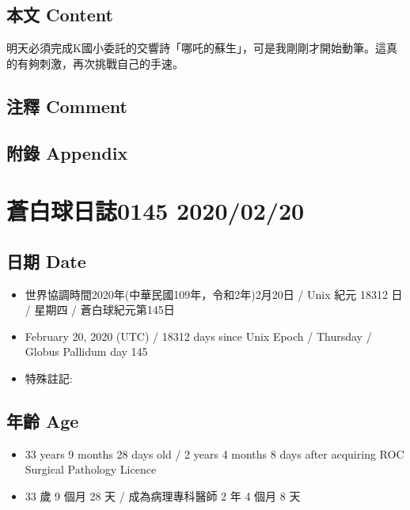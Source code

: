 \documentclass[
]{article}
\providecommand{\tightlist}{%
  \setlength{\itemsep}{0pt}\setlength{\parskip}{0pt}}
\begin{document}
\hypertarget{ux672cux6587-content-18}{%
\subsection{本文 Content}\label{ux672cux6587-content-18}}

明天必須完成K國小委託的交響詩「哪吒的蘇生」，可是我剛剛才開始動筆。這真的有夠刺激，再次挑戰自己的手速。

\hypertarget{ux6ce8ux91cb-comment-18}{%
\subsection{注釋 Comment}\label{ux6ce8ux91cb-comment-18}}

\hypertarget{ux9644ux9304-appendix-18}{%
\subsection{附錄 Appendix}\label{ux9644ux9304-appendix-18}}

\hypertarget{ux84bcux767dux7403ux65e5ux8a8c0145-20200220}{%
\section{蒼白球日誌0145
2020/02/20}\label{ux84bcux767dux7403ux65e5ux8a8c0145-20200220}}

\hypertarget{ux65e5ux671f-date-19}{%
\subsection{日期 Date}\label{ux65e5ux671f-date-19}}

\begin{itemize}
\tightlist
\item
  世界協調時間2020年(中華民國109年，令和2年)2月20日 / Unix 紀元 18312 日
  / 星期四 / 蒼白球紀元第145日
\item
  February 20, 2020 (UTC) / 18312 days since Unix Epoch / Thursday /
  Globus Pallidum day 145
\item
  特殊註記:
\end{itemize}

\hypertarget{ux5e74ux9f61-age-19}{%
\subsection{年齡 Age}\label{ux5e74ux9f61-age-19}}

\begin{itemize}
\tightlist
\item
  33 years 9 months 28 days old / 2 years 4 months 8 days after
  acquiring ROC Surgical Pathology Licence
\item
  33 歲 9 個月 28 天 / 成為病理專科醫師 2 年 4 個月 8 天
\end{itemize}
\end{document}
